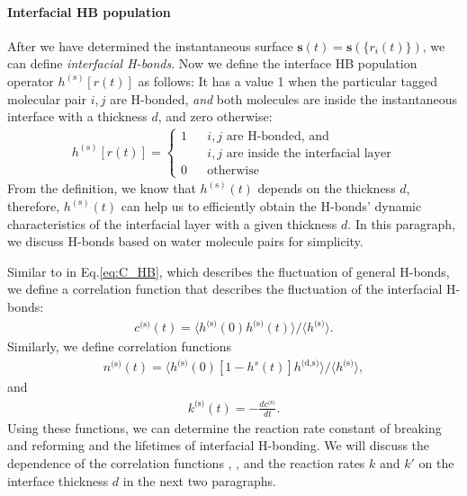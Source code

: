 \FloatBarrier
\paragraph{Interfacial HB population} \label{IHBP}
After we have determined the instantaneous surface ${\mathbf s}(t)={\mathbf s}(\{{r}_i(t)\})$, we can define \emph{interfacial H-bonds}.
Now we define the interface HB population operator $h^{(\text{s})}[{r}(t)]$ as follows:
It has a value 1 when the particular tagged molecular pair $i,j$ are H-bonded, \emph{and} both molecules are inside the instantaneous interface 
with a thickness $d$, and zero otherwise:
\begin{align}
   h^{(\text{s})}[{r}(t)]=\left\{
   \begin{array}{rcl}
           1       &      & {i,j\text{ are H-bonded, and}}\\
                &      & {i,j\text{ are inside the interfacial layer}} \\   \label{eqn:h_s}
           0       &      & {\text{otherwise}}
   \end{array} \right.
\end{align}
From the definition, we know that $h^{(\text{s})}(t)$ depends on the thickness $d$, therefore,
$h^{(\text{s})}(t)$ can help us to efficiently obtain the H-bonds' dynamic characteristics of 
the interfacial layer with a given thickness $d$. %
In this paragraph, we discuss H-bonds based on water molecule pairs for simplicity. 

Similar to \CHB in Eq.\thinspace\ref{eq:C_HB}, which describes the fluctuation of general H-bonds,
we define a correlation function \CSHB that describes the fluctuation of the interfacial H-bonds: 
\begin{eqnarray}
c^\text{(s)}(t)=\langle h^\text{(s)}(0)h^\text{(s)}(t) \rangle/\langle h^\text{(s)}\rangle
\label{eq:C_s_HB}.
\end{eqnarray}
%
Similarly, we define correlation functions 
\begin{eqnarray}
n^\text{(s)}(t)=\langle h^\text{(s)}(0)[1-h^s(t)]h^{\text{(d,s)}} \rangle/\langle h^\text{(s)}\rangle
\label{eq:n_s_HB},
\end{eqnarray}
and 
\begin{eqnarray}
k^\text{(s)}(t)= -\frac{dc^\text{(s)}}{dt}
\label{eq:k_s_HB}.
\end{eqnarray}
Using these functions, we can determine the reaction rate constant of breaking and reforming and the lifetimes of interfacial H-bonding.
We will discuss the dependence of the correlation functions \CHB, \CSHB, and the reaction rates $k$ and $k'$ on the interface thickness $d$ in the next two paragraphs.
%
\FloatBarrier
